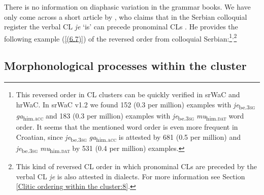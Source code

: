 There is no information on diaphasic variation in the grammar books. We have only come across a short article by \citet{Ondrus57}, who claims that in the Serbian colloquial register the verbal CL \textit{je} ‘is’ can precede pronominal CLs \citep[cf.][517f]{Ondrus57}. He provides the following example (\ref{(6.7)}) of the reversed order from colloquial Serbian:\footnote{This reversed order in CL clusters can be quickly verified in srWaC and hrWaC. In srWaC v1.2 we found 152 (0.3 per million) examples with \textit{je}\textsubscript{be.\textsc{3sg}} \textit{ga}\textsubscript{him.\textsc{acc}} and 183 (0.3 per million) examples with \textit{je}\textsubscript{be.\textsc{3sg}} \textit{mu}\textsubscript{him.\textsc{dat}} word order. It seems that the mentioned word order is even more frequent in Croatian, since \textit{je}\textsubscript{be.\textsc{3sg}} \textit{ga}\textsubscript{him.\textsc{acc}} is attested by 681 (0.5 per million) and \textit{je}\textsubscript{be.\textsc{3sg}} \textit{mu}\textsubscript{him.\textsc{dat}} by 531 (0.4 per million) examples.}\textsuperscript{,}\footnote{This kind of reversed CL order in which pronominal CLs are preceded by the verbal CL \textit{je} is also attested in dialects. For more information see Section \ref{Clitic ordering within the cluster:8}.}


\subsection{Morphonological processes within the cluster}
